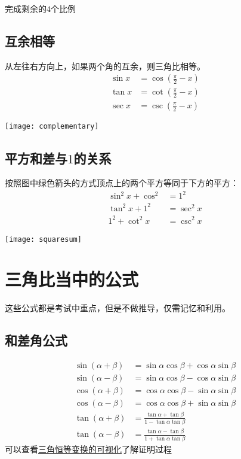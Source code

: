 \begin{TaskBox}
完成剩余的$4$个比例
\end{TaskBox}

\subsection*{互余相等}
\begin{minipage}{0.7\linewidth}
从左往右方向上，如果两个角的互余，则三角比相等。
\begin{align*}
	\sin x &= \cos \left(\frac{\pi}{2}-x\right)\\
	\tan x &= \cot \left(\frac{\pi}{2}-x\right)\\
	\sec x &= \csc \left(\frac{\pi}{2}-x\right)
\end{align*}
\end{minipage}
\hfill
\begin{minipage}{0.3\linewidth}
\texttt{[image: complementary]}
\end{minipage}

\subsection*{平方和差与$1$的关系}
\begin{minipage}{0.7\linewidth}
按照图中绿色箭头的方式顶点上的两个平方等同于下方的平方：
\begin{align*}
	\sin^2 x+\cos^2 &=1^2 \\
	\tan^2 x+1^2 &=\sec^2 x \\
	1^2+ \cot^2 x &=\csc^2 x
\end{align*}
\end{minipage}
\hfill
\begin{minipage}{0.3\linewidth}
\texttt{[image: squaresum]}
\end{minipage}
\clearpage

\section{三角比当中的公式}
这些公式都是考试中重点，但是不做推导，仅需记忆和利用。

\subsection*{和差角公式}
\begin{align*}
\sin \left( \alpha + \beta\right) &= \sin\alpha \cos\beta
+\cos \alpha \sin \beta\\
\sin \left( \alpha - \beta\right) &= \sin\alpha \cos\beta
-\cos \alpha \sin \beta\\
\cos \left( \alpha + \beta\right) &= \cos\alpha \cos\beta
-\sin \alpha \sin \beta\\
\cos \left( \alpha - \beta\right) &= \cos\alpha \cos\beta
+\sin \alpha \sin \beta\\
\tan \left( \alpha + \beta\right) &= \frac{\tan \alpha +\tan \beta}{1-\tan \alpha \tan \beta}\\
\tan \left( \alpha - \beta\right) &= \frac{\tan \alpha -\tan \beta}{1+\tan \alpha \tan \beta}
\end{align*}
可以查看\href{https://www.bilibili.com/video/BV1kN411Q7aP}{三角恒等变换的可视化}了解证明过程

